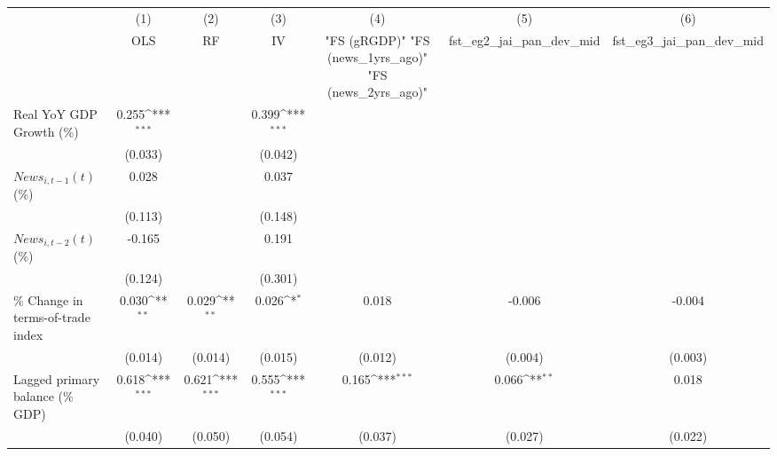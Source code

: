 {
\def\sym#1{\ifmmode^{#1}\else\(^{#1}\)\fi}
\begin{tabular}{l*{6}{c}}
\toprule
                    &\multicolumn{1}{c}{(1)}&\multicolumn{1}{c}{(2)}&\multicolumn{1}{c}{(3)}&\multicolumn{1}{c}{(4)}&\multicolumn{1}{c}{(5)}&\multicolumn{1}{c}{(6)}\\
                    &\multicolumn{1}{c}{OLS}&\multicolumn{1}{c}{RF}&\multicolumn{1}{c}{IV}&\multicolumn{1}{c}{ "FS (gRGDP)"  "FS (news_1yrs_ago)"  "FS (news_2yrs_ago)" }&\multicolumn{1}{c}{fst_eg2_jai_pan_dev_mid}&\multicolumn{1}{c}{fst_eg3_jai_pan_dev_mid}\\
\midrule
Real YoY GDP Growth (\%)&       0.255\sym{***}&                     &       0.399\sym{***}&                     &                     &                     \\
                    &     (0.033)         &                     &     (0.042)         &                     &                     &                     \\
\addlinespace
$ News_{i,t-1}(t)$ (\%)&       0.028         &                     &       0.037         &                     &                     &                     \\
                    &     (0.113)         &                     &     (0.148)         &                     &                     &                     \\
\addlinespace
$ News_{i,t-2}(t)$ (\%)&      -0.165         &                     &       0.191         &                     &                     &                     \\
                    &     (0.124)         &                     &     (0.301)         &                     &                     &                     \\
\addlinespace
\% Change in terms-of-trade index&       0.030\sym{**} &       0.029\sym{**} &       0.026\sym{*}  &       0.018         &      -0.006         &      -0.004         \\
                    &     (0.014)         &     (0.014)         &     (0.015)         &     (0.012)         &     (0.004)         &     (0.003)         \\
\addlinespace
Lagged primary balance (\% GDP)&       0.618\sym{***}&       0.621\sym{***}&       0.555\sym{***}&       0.165\sym{***}&       0.066\sym{**} &       0.018         \\
                    &     (0.040)         &     (0.050)         &     (0.054)         &     (0.037)         &     (0.027)         &     (0.022)         \\

\end{tabular}}
